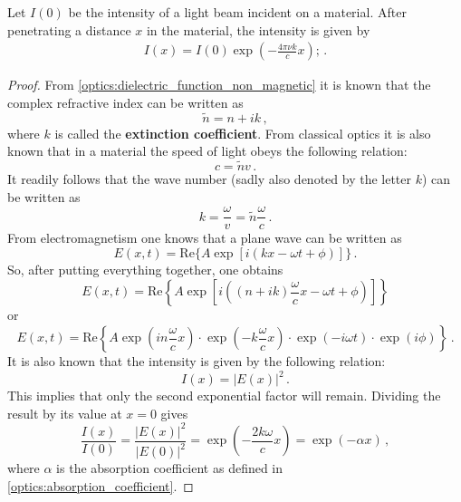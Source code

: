     \begin{theorem}\label{optics:lambert_beer}
        Let $I(0)$ be the intensity of a light beam incident on a material. After penetrating a distance $x$ in the material, the intensity is given by
        \begin{gather}
            I(x) = I(0)\exp\left(-\frac{4\pi\nu k}{c}x\right);\,.
        \end{gather}
        \begin{mdframed}[roundcorner=10pt, linecolor=blue, linewidth=1pt]
            \begin{proof}
                From \cref{optics:dielectric_function_non_magnetic} it is known that the complex refractive index can be written as \[\widetilde{n} = n+ik\,,\] where $k$ is called the \textbf{extinction coefficient}. From classical optics it is also known that in a material the speed of light obeys the following relation: \[c = \widetilde{n}v\,.\] It readily follows that the wave number (sadly also denoted by the letter $k$) can be written as \[k = \frac{\omega}{v} = \widetilde{n}\frac{\omega}{c}\,.\] From electromagnetism one knows that a plane wave can be written as \[E(x,t) = \mathrm{Re}\bigl\{A\exp\left[i(kx - \omega t + \phi)\right]\bigr\}\,.\] So, after putting everything together, one obtains \[E(x,t) = \mathrm{Re}\left\{A\exp\left[i\left((n+ik)\frac{\omega}{c}x - \omega t + \phi\right)\right]\right\}\] or \[E(x,t) = \mathrm{Re}\left\{A\exp\left(in\frac{\omega}{c}x\right)\cdot\exp\left(-k\frac{\omega}{c}x\right)\cdot\exp\left(-i\omega t\right)\cdot\exp\left(i\phi\right)\right\}\,.\] It is also known that the intensity is given by the following relation:\[I(x) = |E(x)|^2\,.\] This implies that only the second exponential factor will remain. Dividing the result by its value at $x=0$ gives \[\frac{I(x)}{I(0)} = \frac{|E(x)|^2}{|E(0)|^2} = \exp\left(-\frac{2k\omega}{c}x\right) = \exp(-\alpha x)\,,\]
                where $\alpha$ is the absorption coefficient as defined in \cref{optics:absorption_coefficient}.
            \end{proof}
        \end{mdframed}
    \end{theorem}



